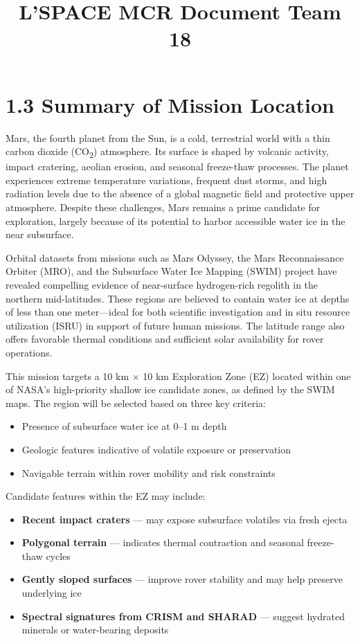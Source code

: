\documentclass[12pt]{article}
\title{L'SPACE MCR Document Team 18}
\date{}
\begin{document}
\section*{1.3 Summary of Mission Location}

Mars, the fourth planet from the Sun, is a cold, terrestrial world with a thin carbon dioxide (CO\textsubscript{2}) atmosphere. Its surface is shaped by volcanic activity, impact cratering, aeolian erosion, and seasonal freeze-thaw processes. The planet experiences extreme temperature variations, frequent dust storms, and high radiation levels due to the absence of a global magnetic field and protective upper atmosphere. Despite these challenges, Mars remains a prime candidate for exploration, largely because of its potential to harbor accessible water ice in the near subsurface.

Orbital datasets from missions such as Mars Odyssey, the Mars Reconnaissance Orbiter (MRO), and the Subsurface Water Ice Mapping (SWIM) project have revealed compelling evidence of near-surface hydrogen-rich regolith in the northern mid-latitudes. These regions are believed to contain water ice at depths of less than one meter—ideal for both scientific investigation and in situ resource utilization (ISRU) in support of future human missions. The latitude range also offers favorable thermal conditions and sufficient solar availability for rover operations.

This mission targets a 10 km × 10 km Exploration Zone (EZ) located within one of NASA’s high-priority shallow ice candidate zones, as defined by the SWIM maps. The region will be selected based on three key criteria:

\begin{itemize}
    \item Presence of subsurface water ice at 0–1 m depth
    \item Geologic features indicative of volatile exposure or preservation
    \item Navigable terrain within rover mobility and risk constraints
\end{itemize}

Candidate features within the EZ may include:

\begin{itemize}
    \item \textbf{Recent impact craters} — may expose subsurface volatiles via fresh ejecta
    \item \textbf{Polygonal terrain} — indicates thermal contraction and seasonal freeze-thaw cycles
    \item \textbf{Gently sloped surfaces} — improve rover stability and may help preserve underlying ice
    \item \textbf{Spectral signatures from CRISM and SHARAD} — suggest hydrated minerals or water-bearing deposits
\end{itemize}
\end{document}
